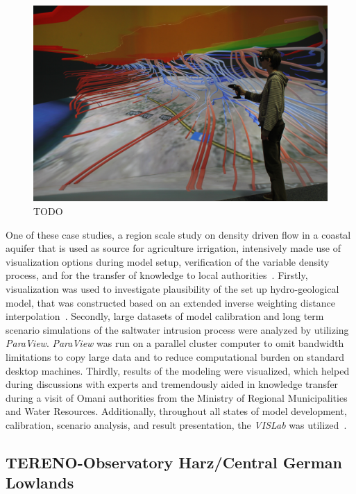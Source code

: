 \documentclass[twocolumn]{svjour3}          %
\newcommand{\myedit}[2]{\textcolor{red}{\st{#1}} \textcolor{blue}{#2}}
\begin{document}
\begin{figure}
  \includegraphics[width=\linewidth]{images/oman.jpg}
\caption{TODO}
\label{fig:oman}
\end{figure}

One of these case studies, a region scale study on density driven flow in a coastal aquifer that is used as source for agriculture irrigation, intensively made use of visualization options during model setup, verification of the variable density process, and for the transfer of knowledge to local authorities~\cite{walther:cam, walther:eesenvirvis}. Firstly, visualization was used to investigate plausibility of the set up hydro-geological model, that was constructed based on an extended inverse weighting distance interpolation~\cite{walther:modelcare}. Secondly, large datasets of model calibration and long term scenario simulations of the saltwater intrusion process were analyzed by utilizing \emph{ParaView}. \emph{ParaView} was run on a parallel cluster computer to omit bandwidth limitations to copy large data and to reduce computational burden on standard desktop machines. Thirdly, results of the modeling were visualized, which helped during discussions with experts and tremendously aided in knowledge transfer during a visit of Omani authorities from the Ministry of Regional Municipalities and Water Resources. Additionally, throughout all states of model development, calibration, scenario analysis, and result presentation, the \emph{VISLab} was utilized~\cite{walther:eesenvirvis}.

\subsection{TERENO-Observatory Harz/Central German Lowlands}\label{tereno-bode}
\end{document}
